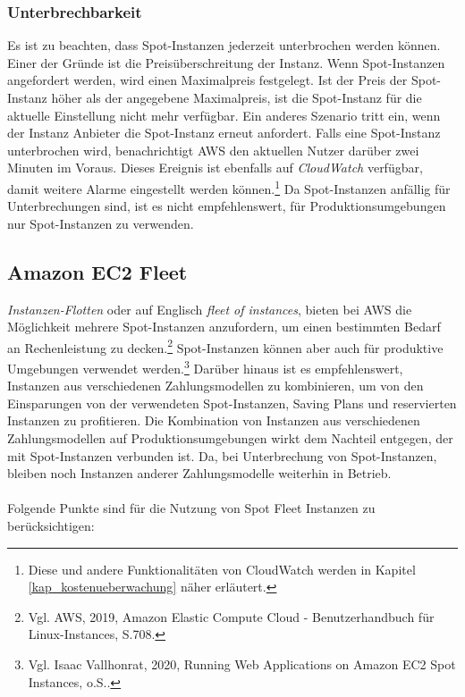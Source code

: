\subsubsection*{Unterbrechbarkeit}
Es ist zu beachten, dass Spot-Instanzen jederzeit unterbrochen werden können. Einer der Gründe ist die Preisüberschreitung der Instanz. Wenn Spot-Instanzen angefordert werden, wird einen Maximalpreis festgelegt. Ist der Preis der Spot-Instanz höher als der angegebene Maximalpreis, ist die Spot-Instanz für die aktuelle Einstellung nicht mehr verfügbar. Ein anderes Szenario tritt ein, wenn der Instanz Anbieter die Spot-Instanz erneut anfordert. Falls eine Spot-Instanz unterbrochen wird, benachrichtigt AWS den aktuellen Nutzer darüber zwei Minuten im Voraus. Dieses Ereignis ist ebenfalls auf \textit{CloudWatch} verfügbar, damit weitere Alarme eingestellt werden können.\footnote{Diese und andere Funktionalitäten von CloudWatch werden in Kapitel \ref{kap_kostenueberwachung} näher erläutert.} Da Spot-Instanzen anfällig für Unterbrechungen sind, ist es nicht empfehlenswert, für Produktionsumgebungen nur Spot-Instanzen zu verwenden.


\subsection{Amazon EC2 Fleet} \label{sssec:AWS-EC2-Fleet}%
\textit{Instanzen-Flotten} oder auf Englisch \textit{fleet of instances}, bieten bei AWS die Möglichkeit mehrere Spot-Instanzen anzufordern, um einen bestimmten Bedarf an Rechenleistung zu decken.\footnote{Vgl. AWS, 2019, Amazon Elastic Compute Cloud - Benutzerhandbuch für Linux-Instances, S.708\cite{AMZ26}.} Spot-Instanzen können aber auch für produktive Umgebungen verwendet werden.\footnote{Vgl. Isaac Vallhonrat, 2020, Running Web Applications on Amazon EC2 Spot Instances, o.S.\cite{AMZ24}.} Darüber hinaus ist es empfehlenswert, Instanzen aus verschiedenen Zahlungsmodellen zu kombinieren, um von den Einsparungen von der verwendeten Spot-Instanzen, Saving Plans und reservierten Instanzen zu profitieren. Die Kombination von Instanzen aus verschiedenen Zahlungsmodellen auf Produktionsumgebungen wirkt dem Nachteil entgegen, der mit Spot-Instanzen verbunden ist. Da, bei Unterbrechung von Spot-Instanzen, bleiben noch Instanzen anderer Zahlungsmodelle weiterhin in Betrieb.
\\\\
Folgende Punkte sind für die Nutzung von Spot Fleet Instanzen zu berücksichtigen:
